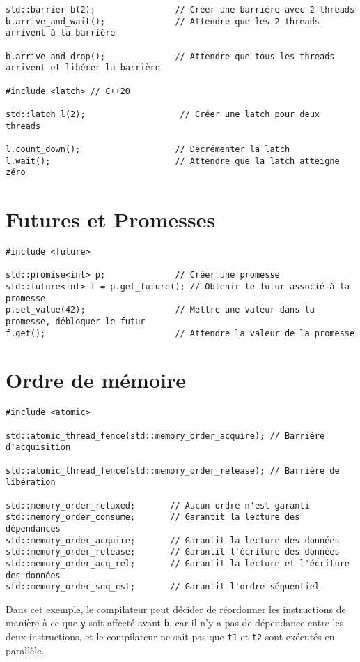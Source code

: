 \documentclass{article}
\newcommand{\cd}{\lstinline}
\begin{document}
\begin{multicols*}{3}
\begin{lstlisting}
std::barrier b(2);                // Créer une barrière avec 2 threads
b.arrive_and_wait();              // Attendre que les 2 threads arrivent à la barrière

b.arrive_and_drop();              // Attendre que tous les threads arrivent et libérer la barrière

#include <latch> // C++20

std::latch l(2);                   // Créer une latch pour deux threads

l.count_down();                   // Décrémenter la latch
l.wait();                         // Attendre que la latch atteigne zéro
\end{lstlisting}

\section*{Futures et Promesses}

\begin{lstlisting}
#include <future>

std::promise<int> p;              // Créer une promesse
std::future<int> f = p.get_future(); // Obtenir le futur associé à la promesse
p.set_value(42);                  // Mettre une valeur dans la promesse, débloquer le futur
f.get();                          // Attendre la valeur de la promesse
\end{lstlisting}

\section*{Ordre de mémoire}

\begin{lstlisting}
#include <atomic>

std::atomic_thread_fence(std::memory_order_acquire); // Barrière d'acquisition

std::atomic_thread_fence(std::memory_order_release); // Barrière de libération

std::memory_order_relaxed;       // Aucun ordre n'est garanti
std::memory_order_consume;       // Garantit la lecture des dépendances
std::memory_order_acquire;       // Garantit la lecture des données
std::memory_order_release;       // Garantit l'écriture des données
std::memory_order_acq_rel;       // Garantit la lecture et l'écriture des données
std::memory_order_seq_cst;       // Garantit l'ordre séquentiel
\end{lstlisting}

Dans cet exemple, le compilateur peut décider de réordonner les instructions de manière à ce que \cd{y} soit affecté avant \cd{b}, car il n'y a pas de dépendance entre les deux instructions, et le compilateur ne sait pas que \cd{t1} et \cd{t2} sont exécutés en parallèle.


\end{multicols*}
\end{document}
